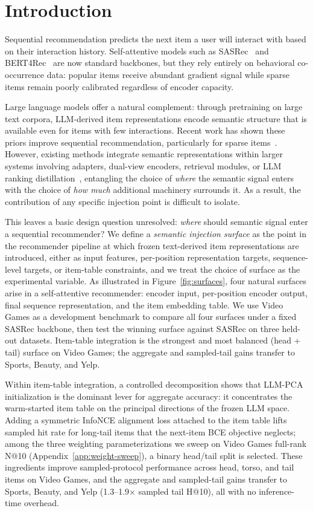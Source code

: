 \documentclass{article}
\begin{document}
\section{Introduction}

Sequential recommendation predicts the next item a user will interact
with based on their interaction history. Self-attentive models such as
SASRec~\cite{kang2018sasrec} and BERT4Rec~\cite{sun2019bert4rec} are
now standard backbones, but they rely entirely on behavioral co-occurrence
data: popular items receive abundant gradient signal while sparse items
remain poorly calibrated regardless of encoder capacity.

Large language models offer a natural complement: through pretraining on
large text corpora, LLM-derived item representations encode semantic
structure that is available even for items with few interactions. Recent
work has shown these priors improve sequential recommendation,
particularly for sparse items~\cite{llmemb, llmesr}. However, existing
methods integrate semantic representations within larger systems involving
adapters, dual-view encoders, retrieval modules, or LLM ranking
distillation~\cite{dllm2rec}, entangling the choice of \emph{where} the
semantic signal enters with the choice of \emph{how much} additional
machinery surrounds it. As a result, the contribution of any specific
injection point is difficult to isolate.

This leaves a basic design question unresolved: \emph{where} should
semantic signal enter a sequential recommender? We define a
\emph{semantic injection surface} as the point in the recommender
pipeline at which frozen text-derived item representations are
introduced, either as input features, per-position representation
targets, sequence-level targets, or item-table constraints, and we
treat the choice of surface as the experimental variable. As
illustrated in Figure~\ref{fig:surfaces}, four natural surfaces arise
in a self-attentive recommender: encoder input, per-position encoder
output, final sequence representation, and the item embedding table.
We use Video Games as a development benchmark to compare all four
surfaces under a fixed SASRec backbone, then test the winning
surface against SASRec on three held-out datasets. Item-table
integration is the strongest and most balanced (head + tail) surface
on Video Games; the aggregate and sampled-tail gains transfer to
Sports, Beauty, and Yelp.

Within item-table integration, a controlled decomposition shows
that LLM-PCA initialization is the dominant lever for aggregate
accuracy: it concentrates the warm-started item table on the
principal directions of the frozen LLM space. Adding a symmetric
InfoNCE alignment loss attached to the item table lifts
sampled hit rate for long-tail items that the next-item BCE objective neglects;
among the three weighting parameterizations we sweep on Video Games full-rank N@10
(Appendix~\ref{app:weight-sweep}), a binary head/tail split is
selected. These ingredients improve sampled-protocol performance across head,
torso, and tail items on Video Games, and the aggregate and
sampled-tail gains transfer to Sports, Beauty, and Yelp
(1.3--1.9$\times$ sampled tail H@10), all with no inference-time
overhead.
\end{document}
